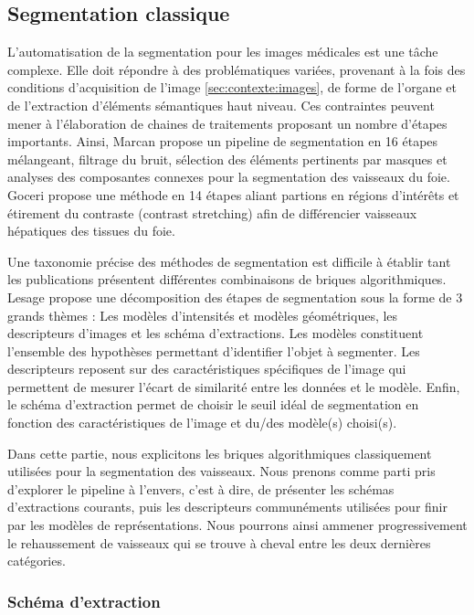 \subsection{Segmentation classique}
\label{sec:EA:segmentation_classique}
% 
L'automatisation de la segmentation pour les images médicales est une tâche complexe. Elle doit répondre à des problématiques variées, provenant à la fois des conditions d'acquisition de l'image \ref{sec:contexte:images}, de forme de l'organe et de l'extraction d'éléments sémantiques haut niveau. Ces contraintes peuvent mener à l'élaboration de chaines de traitements proposant un nombre d'étapes importants. Ainsi, Marcan \cite{Marcan2014_vessel_seg} propose un pipeline de segmentation en 16 étapes mélangeant, filtrage du bruit, sélection des éléments pertinents par masques et analyses des composantes connexes pour la segmentation des vaisseaux du foie. Goceri \cite{Goceri2017_vessel} propose une méthode en 14 étapes aliant partions en régions d'intérêts et étirement du contraste (contrast stretching) afin de différencier vaisseaux hépatiques des tissues du foie.

Une taxonomie précise des méthodes de segmentation est difficile à établir tant les publications présentent différentes combinaisons de briques algorithmiques. Lesage \cite{Lesage2009_review} propose une décomposition des étapes de segmentation sous la forme de 3 grands thèmes : Les modèles d'intensités et modèles géométriques, les descripteurs d'images et les schéma d'extractions. Les modèles constituent l'ensemble des hypothèses permettant d'identifier l'objet à segmenter. Les descripteurs reposent sur des caractéristiques spécifiques de l'image qui permettent de mesurer l'écart de similarité entre les données et le modèle. Enfin, le schéma d'extraction permet de choisir le seuil idéal de segmentation en fonction des caractéristiques de l'image et du/des modèle(s) choisi(s).

Dans cette partie, nous explicitons les briques algorithmiques classiquement utilisées pour la segmentation des vaisseaux. Nous prenons comme parti pris d'explorer le pipeline à l'envers, c'est à dire, de présenter les schémas d'extractions courants, puis les descripteurs communéments utilisées pour finir par les modèles de représentations. Nous pourrons ainsi ammener progressivement le rehaussement de vaisseaux qui se trouve à cheval entre les deux dernières catégories.

\subsubsection{Schéma d'extraction}

